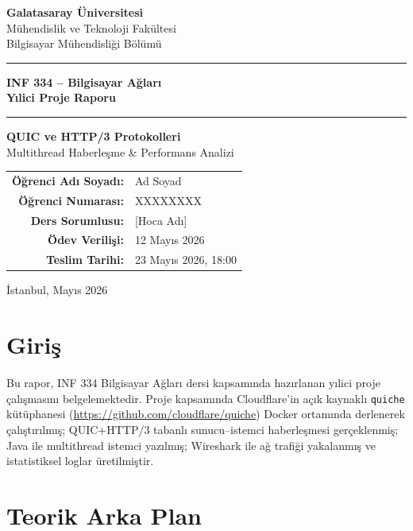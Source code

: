 \documentclass[12pt,a4paper]{article}
\begin{document}
\begin{titlepage}
  \centering
  \vspace*{1.5cm}
  {\Large \textbf{Galatasaray Üniversitesi}\\
  Mühendislik ve Teknoloji Fakültesi\\
  Bilgisayar Mühendisliği Bölümü}
  \vspace{1cm}
  \rule{\linewidth}{0.5mm}
  \vspace{0.5cm}
  {\LARGE \textbf{INF 334 – Bilgisayar Ağları}\\[0.4cm]
   \huge \textbf{Yılici Proje Raporu}}
  \vspace{0.5cm}
  \rule{\linewidth}{0.5mm}
  \vspace{1.5cm}
  {\Large \textbf{QUIC ve HTTP/3 Protokolleri}\\[0.3cm]
   \large Multithread Haberleşme \& Performans Analizi}
  \vspace{2cm}
  \begin{tabular}{rl}
    \textbf{Öğrenci Adı Soyadı:} & Ad Soyad \\[4pt]
    \textbf{Öğrenci Numarası:}   & XXXXXXXX \\[4pt]
    \textbf{Ders Sorumlusu:}     & [Hoca Adı] \\[4pt]
    \textbf{Ödev Verilişi:}      & 12 Mayıs 2026 \\[4pt]
    \textbf{Teslim Tarihi:}      & 23 Mayıs 2026, 18:00 \\
  \end{tabular}
  \vfill
  {\small İstanbul, Mayıs 2026}
\end{titlepage}
\tableofcontents
\newpage
\section{Giriş}
Bu rapor, INF 334 Bilgisayar Ağları dersi kapsamında hazırlanan yılici proje
çalışmasını belgelemektedir. Proje kapsamında Cloudflare'in açık kaynaklı
\texttt{quiche} kütüphanesi (\url{https://github.com/cloudflare/quiche})
Docker ortamında derlenerek çalıştırılmış; QUIC+HTTP/3 tabanlı
sunucu--istemci haberleşmesi gerçeklenmiş; Java ile multithread istemci
yazılmış; Wireshark ile ağ trafiği yakalanmış ve istatistiksel loglar
üretilmiştir.
\section{Teorik Arka Plan}
\end{document}
